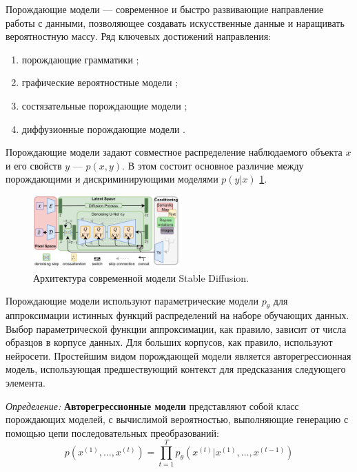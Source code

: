 Порождающие модели --- современное и быстро развивающие направление работы с данными, позволяющее создавать искусственные данные и 
наращивать вероятностную массу. Ряд ключевых достижений направления:
\begin{enumerate}
    \item порождающие грамматики \cite{chomsky2002syntactic};
    \item графические вероятностные модели \cite{pearl1988probabilistic};
    \item состязательные порождающие модели \cite{goodfellow2020generative};
    \item диффузионные порождающие модели \cite{song2020score}.
\end{enumerate}
Порождающие модели задают совместное распределение наблюдаемого объекта $x$ и его свойств $y$ --- $p(x,y)$. 
В этом состоит основное различие между порождающими и дискриминирующими моделями $p(y|x)$ \ref{discr_vs_gen}.
\begin{figure}[h]
    \centering
    \includegraphics[width=0.5\textwidth]{assets/ml/generation/stable_diffusion.png}
    \caption{Архитектура современной модели Stable Diffusion.}
    \label{discr_vs_gen}
\end{figure}

Порождающие модели используют параметрические модели $p_\theta$ для аппроксимации истинных функций распределений на наборе обучающих данных.
Выбор параметрической функции аппроксимации, как правило, зависит от числа образцов в корпусе данных. Для больших корпусов, как правило, используют нейросети.
Простейшим видом порождающей модели является авторегрессионная модель, использующая предшествующий контекст для предсказания следующего элемента.

\textit{Определение:} \textbf{Авторегрессионные модели} представляют собой класс порождающих моделей,
с вычислимой  вероятностью, выполняющие генерацию с помощью цепи последовательных преобразований:
 \begin{equation}
    p(x^{(1)},\dots,x^{(t)}) = \prod_{t=1}^T p_\theta(x^{(t)}|x^{(1)},\dots,x^{(t-1)})
\end{equation}

